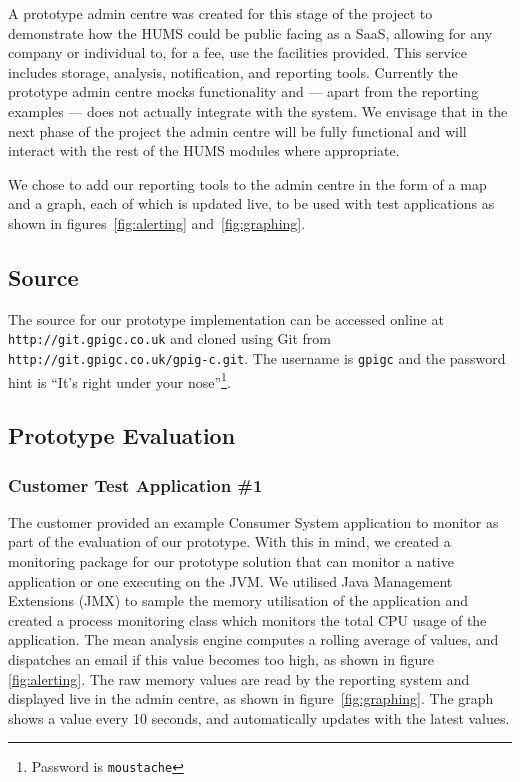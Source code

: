 \documentclass[10pt,a4paper]{article}
\begin{document}
A prototype admin centre was created for this stage of the project to 
demonstrate how the HUMS could be public facing as a SaaS, allowing for any 
company or individual to, for a fee, use the facilities provided. This service includes
storage, analysis, notification, and reporting tools. Currently the prototype 
admin centre mocks functionality and --- apart from the reporting examples --- 
does not actually integrate with the system. We envisage that in the next phase 
of the project the admin centre will be fully functional and will interact with the rest of the HUMS modules where appropriate.

We chose to add our reporting tools to the admin centre in the form of a map
and a graph, each of which is updated live, to be used with test applications as shown in figures~\ref{fig:alerting} and~\ref{fig:graphing}.

\subsection{Source}
\label{sec:source}
The source for our prototype implementation can be accessed online at \texttt{http://git.gpigc.co.uk} and cloned using Git from \texttt{http://git.gpigc.co.uk/gpig-c.git}. The username is \texttt{gpigc} and the password hint is ``It's right under your nose''\footnote{Password is \texttt{moustache}}.

\subsection{Prototype Evaluation}
\label{sec:prototype-evaluation}

\subsubsection{Customer Test Application \#1}
\label{sec:testapp}
The customer provided an example Consumer System application to monitor as part of the
evaluation of our prototype. With this in mind, we created a monitoring 
package for our prototype solution that can monitor a native application
or one executing on the JVM. We utilised Java Management 
Extensions (JMX) to sample the memory utilisation of the application and
created a process monitoring class which monitors the total
CPU usage of the application. The mean analysis engine computes a 
rolling average of values, and dispatches an email if this value
becomes too high, as shown in figure \ref{fig:alerting}. The raw memory
values are read by the reporting system and displayed live in the admin
centre, as shown in figure~\ref{fig:graphing}. The graph shows a value
every 10 seconds, and automatically updates with the latest values.
\end{document}
